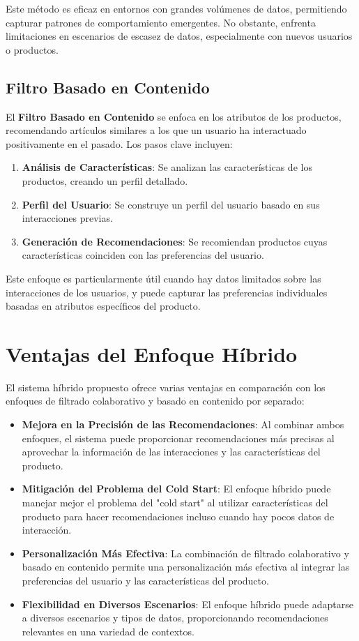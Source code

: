 \documentclass{llncs}
\begin{document}
Este método es eficaz en entornos con grandes volúmenes de datos, permitiendo capturar patrones de comportamiento emergentes. No obstante, enfrenta limitaciones en escenarios de escasez de datos, especialmente con nuevos usuarios o productos.

\subsection{Filtro Basado en Contenido}
El \textbf{Filtro Basado en Contenido} se enfoca en los atributos de los productos, recomendando artículos similares a los que un usuario ha interactuado positivamente en el pasado. Los pasos clave incluyen:

\begin{enumerate}
    \item \textbf{Análisis de Características}: Se analizan las características de los productos, creando un perfil detallado.
    \item \textbf{Perfil del Usuario}: Se construye un perfil del usuario basado en sus interacciones previas.
    \item \textbf{Generación de Recomendaciones}: Se recomiendan productos cuyas características coinciden con las preferencias del usuario.
\end{enumerate}

Este enfoque es particularmente útil cuando hay datos limitados sobre las interacciones de los usuarios, y puede capturar las preferencias individuales basadas en atributos específicos del producto.

\section{Ventajas del Enfoque Híbrido}
El sistema híbrido propuesto ofrece varias ventajas en comparación con los enfoques de filtrado colaborativo y basado en contenido por separado:

\begin{itemize}
    \item \textbf{Mejora en la Precisión de las Recomendaciones}: Al combinar ambos enfoques, el sistema puede proporcionar recomendaciones más precisas al aprovechar la información de las interacciones y las características del producto.
    \item \textbf{Mitigación del Problema del Cold Start}: El enfoque híbrido puede manejar mejor el problema del "cold start" al utilizar características del producto para hacer recomendaciones incluso cuando hay pocos datos de interacción.
    \item \textbf{Personalización Más Efectiva}: La combinación de filtrado colaborativo y basado en contenido permite una personalización más efectiva al integrar las preferencias del usuario y las características del producto.
    \item \textbf{Flexibilidad en Diversos Escenarios}: El enfoque híbrido puede adaptarse a diversos escenarios y tipos de datos, proporcionando recomendaciones relevantes en una variedad de contextos.
\end{itemize}
\end{document}
